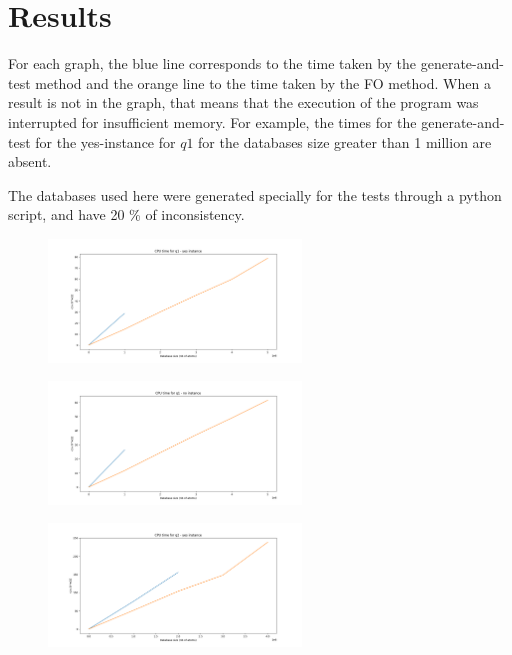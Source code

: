 
\section{Results}

For each graph, the blue line corresponds to the time taken by the
generate-and-test method and the orange line to the time taken by the FO
method. When a result is not in the graph, that means that the execution of the
program was interrupted for insufficient memory. For example, the times for the
generate-and-test for the yes-instance for $q1$ for the databases size greater
than 1 million are absent.

The databases used here were generated specially for the tests through a python script, and have 20 \% of inconsistency.

\begin{figure}[H]
\includegraphics[width=0.6\textwidth]{time_q1_yesinstance.png}
\centering
\end{figure}

\begin{figure}[H]
\includegraphics[width=0.6\textwidth]{time_q1_noinstance.png}
\centering
\end{figure}

\begin{figure}[H]
\includegraphics[width=0.6\textwidth]{time_q2_yesinstance.png}
\centering
\end{figure}

